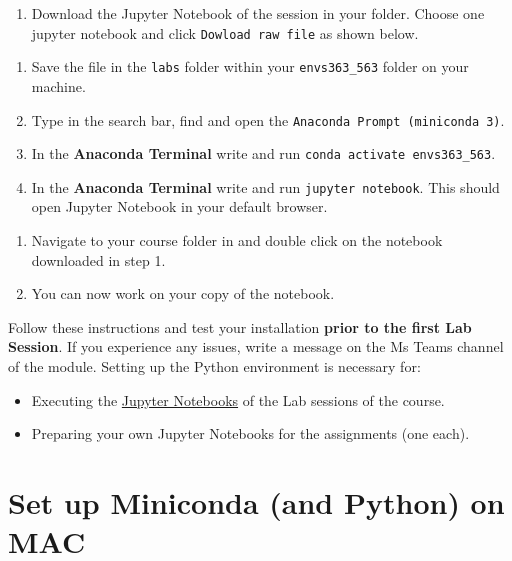 \documentclass[
  letterpaper,
  DIV=11,
  numbers=noendperiod]{scrreprt}
\providecommand{\tightlist}{%
  \setlength{\itemsep}{0pt}\setlength{\parskip}{0pt}}\usepackage{longtable,booktabs,array}
\begin{document}
\begin{enumerate}
\def\labelenumi{\arabic{enumi}.}
\tightlist
\item
  Download the Jupyter Notebook of the session in your folder. Choose
  one jupyter notebook and click \texttt{Dowload\ raw\ file} as shown
  below.
\end{enumerate}

\begin{enumerate}
\def\labelenumi{\arabic{enumi}.}
\setcounter{enumi}{1}
\tightlist
\item
  Save the file in the \texttt{labs} folder within your
  \texttt{envs363\_563} folder on your machine.
\item
  Type in the search bar, find and open the
  \texttt{Anaconda\ Prompt\ (miniconda\ 3)}.
\item
  In the \textbf{Anaconda Terminal} write and run
  \texttt{conda\ activate\ envs363\_563}.
\item
  In the \textbf{Anaconda Terminal} write and run
  \texttt{jupyter\ notebook}. This should open Jupyter Notebook in your
  default browser.
\end{enumerate}

\begin{enumerate}
\def\labelenumi{\arabic{enumi}.}
\setcounter{enumi}{5}
\tightlist
\item
  Navigate to your course folder in and double click on the notebook
  downloaded in step 1.
\item
  You can now work on your copy of the notebook.
\end{enumerate}

Follow these instructions and test your installation \textbf{prior to
the first Lab Session}. If you experience any issues, write a message on
the Ms Teams channel of the module. Setting up the Python environment is
necessary for:

\begin{itemize}
\tightlist
\item
  Executing the \href{https://docs.jupyter.org/en/latest/}{Jupyter
  Notebooks} of the Lab sessions of the course.
\item
  Preparing your own Jupyter Notebooks for the assignments (one each).
\end{itemize}

\section*{Set up Miniconda (and Python) on
MAC}\label{set-up-miniconda-and-python-on-mac}
\end{document}
